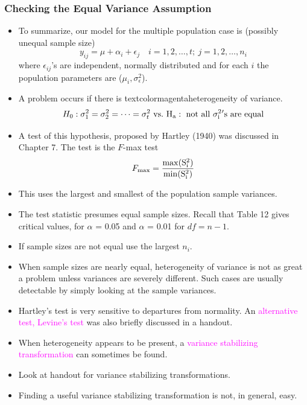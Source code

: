 \documentclass[xcolor=dvipsnames,12pt]{beamer}
\begin{document}
\begin{frame}
\frametitle{{Checking the Equal Variance Assumption}}
\begin{itemize}
\item To summarize, our model for the multiple population case is
(possibly unequal sample size)
$$
  y_{ij} = \mu + \alpha_i + \epsilon_j \quad i=1,2,\ldots,t; \ j=1,2,\ldots,n_i
$$
where $\epsilon_{ij}$'s are independent, normally distributed and
for each $i$ the population parameters are ($\mu_i,
\sigma_\epsilon^2$).
\item A problem occurs if there is textcolor{magenta}{heterogeneity of variance}.  
$$
  H_0: \sigma_1^2 = \sigma_2^2 = \cdots = \sigma_t^2 \rm{\ vs.\ }  H_a: \rm{~not~all~} \sigma_i^2 \rm{'s~are~equal}
$$
\end{itemize}
\end{frame}

\begin{frame}
\begin{itemize}
\item A test of this hypothesis, proposed by Hartley (1940) was discussed in Chapter 7.
 The test is the $F$-max test
$$
  F_{\rm{max}} = \frac{\rm{{max}}(S_i^2)}{\rm{min}(S_i^2)}
$$
\item This uses the largest and smallest of the population sample variances.
\item The test statistic presumes equal sample sizes.  Recall that Table 12
gives critical values, for $\alpha$ = 0.05 and
$\alpha$ = 0.01  for $df = n-1$. 
\item  If sample sizes are not equal
use the largest $n_i$.
\end{itemize}
\end{frame}

\begin{frame}
\begin{itemize}
\item When sample sizes are nearly equal, heterogeneity of variance is not
as great a problem unless variances are severely different.  Such 
cases are usually detectable by simply looking at the sample
variances. 
\item Hartley's test is very sensitive to
departures from normality. An \textcolor{magenta}{alternative test, Levine's test} was also briefly
discussed in a handout.
\item When heterogeneity appears to be present, a \textcolor{magenta}{variance stabilizing
transformation} can sometimes be found. 
\item  Look at handout for variance stabilizing transformations.
\item Finding a useful variance stabilizing transformation is not, in
general, easy.
\end{itemize}
\end{frame}
\end{document}

